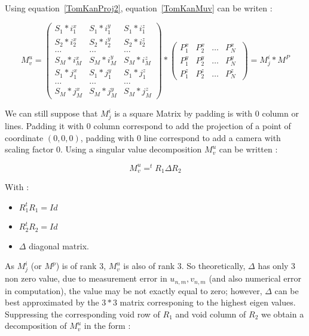 Using equation~\ref{TomKanProj2}, equation~\ref{TomKanMuv} can be writen :


\begin{equation}
   M^u_v= \left( \begin{array}{ccc} 
             S_1*i^x_1 & S_1*i^y_1 & S_1*i^z_1 \\
             S_2*i^x_2 & S_2*i^y_2 & S_2*i^z_2 \\
             \dots & \dots & \dots \\
             S_M*i^x_M & S_M*i^y_M & S_M*i^z_M \\
             S_1*j^x_1 & S_1* j^y_1 & S_1* j^z_1 \\
             \dots & \dots & \dots \\
             S_M*j^x_M & S_M*j^y_M & S_M*j^z_M 
        \end{array} 
\right)
       *
        \left( \begin{array}{cccc} 
             P^x_1 & P^x_2 &  \dots & P^x_N \\
             P^y_1 & P^y_2 &  \dots & P^y_N \\
             P^z_1 & P^z_2 &  \dots & P^z_N \
        \end{array} 
        \right)
     = M^i_j * M^P
    \label{TomKanFactMUV}
\end{equation}



We can still
suppose that $M^i_j$ is a square Matrix by padding is with $0$ column or lines.
Padding it with $0$ column correspond to add the projection of a point of coordinate
 $(0,0,0)$, padding with $0$ line correspond to add a camera with scaling factor $0$.
Using a singular value decomposition $M^u_v$ can be written :


\begin{equation}
   M^u_v=   ^t R_1 \Delta R_2
\end{equation}

With  :

\begin{itemize}
   \item  $R_1 ^t R_1 = Id$  
   \item  $R_2 ^t R_2 = Id$  
   \item  $\Delta$ diagonal matrix.
\end{itemize}

As $M^i_j$ (or $M^p$) is of rank $3$, $M^u_v$ is also of rank $3$.  So  theoretically, $\Delta$  has only $3$
non zero value, due to measurement  error in $u_{n,m},v_{n,m}$ (and also numerical error in computation), the value may be not exactly equal to zero; however,
 $\Delta$  can be best approximated by the $3*3$ matrix corresponing to the highest eigen values. Suppressing
the corresponding void row of $R_1$ and void column of $R_2$ we obtain a
decomposition of $M^u_v$ in the form :

